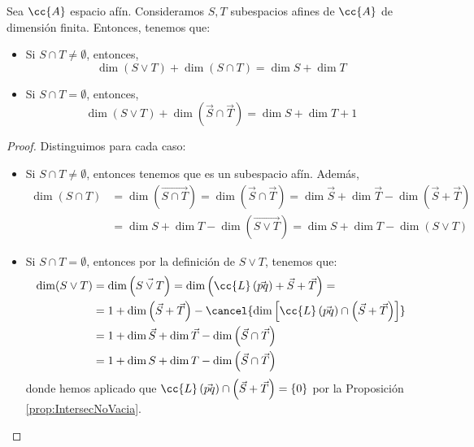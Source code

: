 \begin{teo}[Dimensiones]
    Sea $\cc{A}$ espacio afín. Consideramos $S,T$ subespacios afines de $\cc{A}$ de dimensión finita. Entonces, tenemos que:
    \begin{itemize}
        \item Si $S\cap T\neq \emptyset$, entonces,
        \begin{equation*}
            \dim \left(S\vee T\right)+\dim (S\cap T)= \dim S + \dim T
        \end{equation*}

        \item Si $S\cap T= \emptyset$, entonces,
        \begin{equation*}
            \dim (S\vee T)+\dim\left(\vec{S} \cap \vec{T}\right)=\dim S + \dim T +1
        \end{equation*}
    \end{itemize}
\end{teo}
\begin{proof} Distinguimos para cada caso:
    \begin{itemize}
        \item Si $S\cap T\neq \emptyset$, entonces tenemos que es un subespacio afín. Además,
    \begin{equation*}\begin{split}
            \dim (S\cap T)
            &=\dim\left(\vec{S\cap T}\right)
            = \dim\left(\vec{S}\cap \vec{T}\right)
            = \dim \vec{S} + \dim \vec{T} - \dim \left(\vec{S}+\vec{T}\right)\\
            &= \dim S + \dim T - \dim \left(\vec{S\vee T}\right)
            = \dim S + \dim T - \dim \left(S\vee T\right)
        \end{split}\end{equation*}

        \item Si $S\cap T= \emptyset$, entonces por la definición de $S\vee T$, tenemos que:
        \begin{equation*}\begin{split}
            \dim (S\vee T)
            &=\dim\left(\vec{S\vee T}\right)
            = \dim\left(\cc{L}\left(\vec{pq}\right) + \vec{S} + \vec{T}\right)
            =\\
            &= 1 + \dim\left(\vec{S} + \vec{T}\right) - \cancel{\dim\left[\cc{L}\left(\vec{pq}\right)\cap \left(\vec{S} + \vec{T}\right)\right]}\\
            &= 1 + \dim \vec{S} + \dim\vec{T} - \dim\left(\vec{S} \cap \vec{T}\right) \\
            &= 1 + \dim S + \dim T - \dim\left(\vec{S} \cap \vec{T}\right)
        \end{split}\end{equation*}
        donde hemos aplicado que $\cc{L}\left(\vec{pq}\right)\cap \left(\vec{S} + \vec{T}\right)=\{0\}$ por la Proposición \ref{prop:IntersecNoVacia}.
    \end{itemize}
\end{proof}

